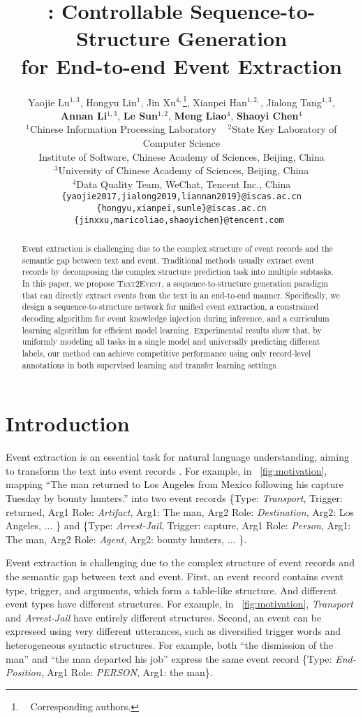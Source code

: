 \documentclass[11pt,a4paper]{article}
\title{\modelname: Controllable Sequence-to-Structure Generation \\ for End-to-end Event Extraction}
\author{
  Yaojie Lu${}^{1,3}$,
  Hongyu Lin${}^{1}$,
  Jin Xu${}^{4,}$\thanks{~ Corresponding authors.},
  Xianpei Han${}^{1,2,}$\footnotemark[1],
  Jialong Tang${}^{1,3}$,
  \\
  \textbf{Annan Li}${}^{1,3}$,
  \textbf{Le Sun}${}^{1,2}$,
  \textbf{Meng Liao}${}^{4}$,
  \textbf{Shaoyi Chen}${}^{4}$
  \\
  ${}^{1}$Chinese Information Processing Laboratory ~
  ${}^{2}$State Key Laboratory of Computer Science \\
  Institute of Software, Chinese Academy of Sciences, Beijing, China\\
  ${}^{3}$University of Chinese Academy of Sciences, Beijing, China \\
  ${}^{4}$Data Quality Team, WeChat, Tencent Inc., China \\
 {\tt \{yaojie2017,jialong2019,liannan2019\}@iscas.ac.cn} \\
 {\tt \{hongyu,xianpei,sunle\}@iscas.ac.cn} \\
 {\tt \{jinxxu,maricoliao,shaoyichen\}@tencent.com }
}
\date{}
\newcommand\modelname{\textsc{Text2Event}}
\newcommand{\eventtpye}[1]{\textit{#1}}
\begin{document}
\maketitle

\begin{abstract}

Event extraction is challenging due to the complex structure of event records and the semantic gap between text and event.
Traditional methods usually extract event records by decomposing the complex structure prediction task into multiple subtasks.
In this paper, we propose \modelname, a sequence-to-structure generation paradigm that can directly extract events from the text in an end-to-end manner.
Specifically, we design a sequence-to-structure network for unified event extraction, a constrained decoding algorithm for event knowledge injection during inference, and a curriculum learning algorithm for efficient model learning.
Experimental results show that, by uniformly modeling all tasks in a single model and universally predicting different labels, our method can achieve competitive performance using only record-level annotations in both supervised learning and transfer learning settings.

\end{abstract}
 
\section{Introduction}\label{sec:introduction}

Event extraction is an essential task for natural language understanding, aiming to transform the text into event records \citep{doddington-etal-2004-automatic,ahn:2006:ARTE}.
For example, in \figurename~\ref{fig:motivation}, mapping ``The man returned to Los Angeles from Mexico following his capture Tuesday by bounty hunters.'' into two event records 
\{Type: \eventtpye{Transport}, Trigger: returned, Arg1 Role: \eventtpye{Artifact}, Arg1: The man, Arg2 Role: \eventtpye{Destination}, Arg2: Los Angeles, ... \} 
and 
\{Type: \eventtpye{Arrest-Jail}, Trigger: capture, Arg1 Role: \eventtpye{Person}, Arg1: The man, Arg2 Role: \eventtpye{Agent}, Arg2: bounty hunters, ... \}.

Event extraction is challenging due to the complex structure of event records and the semantic gap between text and event.
First, an event record contains event type, trigger, and arguments, which form a table-like structure.
And different event types have different structures.
For example, in \figurename~\ref{fig:motivation}, \eventtpye{Transport} and \eventtpye{Arrest-Jail} have entirely different structures.
Second, an event can be expressed using very different utterances, such as diversified trigger words and heterogeneous syntactic structures.
For example, both ``the dismission of the man'' and ``the man departed his job'' express the same event record \{Type: \eventtpye{End-Position}, Arg1 Role: \eventtpye{PERSON}, Arg1: the man\}.
\end{document}
